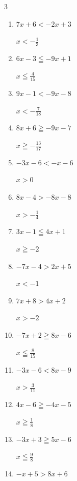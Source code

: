 \begin{multicols}{3}
\begin{enumerate}
        $\displaystyle x\leqq -\frac{2}{5}$

  \item $7x+6<-2x+3$

        $\displaystyle x<-\frac{1}{3}$

  \item $6x-3\leqq -9x+1$

        $\displaystyle x\leqq \frac{4}{15}$

  \item $9x-1<-9x-8$

        $\displaystyle x<-\frac{7}{18}$

  \item $8x+6\geqq -9x-7$

        $\displaystyle x\geqq -\frac{13}{17}$

  \item $-3x-6<-x-6$

        $\displaystyle x>0$

  \item $8x-4>-8x-8$

        $\displaystyle x>-\frac{1}{4}$

\columnbreak %

  \item $3x-1\leqq 4x+1$

        $\displaystyle x\geqq -2$

  \item $-7x-4>2x+5$

        $\displaystyle x<-1$

  \item $7x+8>4x+2$

        $\displaystyle x>-2$

  \item $-7x+2\geqq 8x-6$

        $\displaystyle x\leqq \frac{8}{15}$

  \item $-3x-6<8x-9$

        $\displaystyle x>\frac{3}{11}$

  \item $4x-6\geqq -4x-5$

        $\displaystyle x\geqq \frac{1}{8}$

  \item $-3x+3\geqq 5x-6$

        $\displaystyle x\leqq \frac{9}{8}$

  \item $-x+5>8x+6$


\end{enumerate}
\end{multicols}

